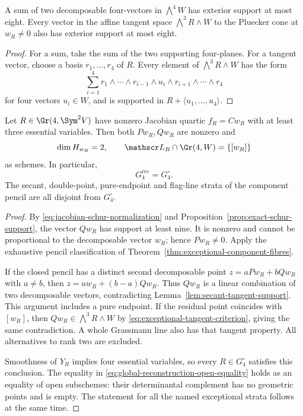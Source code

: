 \begin{lemma}
\label{lem:secant-tangent-support}
A sum of two decomposable four-vectors in \(\bigwedge^4W\)
has exterior support at most eight.  Every vector in the affine
tangent space \(\bigwedge^3R\wedge W\) to the Pluecker cone
at \(w_R\ne0\) also has exterior support at most eight.
\end{lemma}
\begin{proof}
For a sum, take the sum of the two supporting four-planes.  For a
tangent vector, choose a basis \(r_1,\ldots,r_4\) of \(R\).
Every element of \(\bigwedge^3R\wedge W\) has the form
\[
 \sum_{i=1}^4 r_1\wedge\cdots\wedge r_{i-1}
             \wedge u_i\wedge r_{i+1}\wedge\cdots\wedge r_4
\]
for four vectors \(u_i\in W\), and is supported in
\(R+\langle u_1,\ldots,u_4\rangle\).
\end{proof}

\begin{theorem}
\label{thm:global-schur-recombination}
Let \(R\in\Gr(4,\Sym^2V)\) have nonzero Jacobian quartic
\(f_R=Cw_R\) with at least three essential variables.  Then
both \(Pw_R,Qw_R\) are nonzero and
\[
 \dim H_{w_R}=2,\qquad
 \mathscr L_R\cap\Gr(4,W)=\{[w_R]\}
\]
as schemes.  In particular,
\begin{equation}\label{eq:global-reconstruction-open-equality}
                  G_4^{\mathrm{rec}}=G_4^\circ.
\end{equation}
The secant, double-point, pure-endpoint and flag-line strata of the
component pencil are all disjoint from \(G_4^\circ\).
\end{theorem}
\begin{proof}
By \eqref{eq:jacobian-schur-normalization} and
Proposition~\ref{prop:exact-schur-support}, the vector \(Qw_R\)
has support at least nine.  It is nonzero and cannot be proportional
to the decomposable vector \(w_R\); hence \(Pw_R\ne0\).
Apply the exhaustive pencil classification of
Theorem~\ref{thm:exceptional-component-fibres}.

If the closed pencil has a distinct second decomposable point
\(z=aPw_R+bQw_R\) with \(a\ne b\), then
\(z=a w_R+(b-a)Qw_R\).  Thus \(Qw_R\) is a linear
combination of two decomposable vectors, contradicting
Lemma~\ref{lem:secant-tangent-support}.  This argument includes a
pure endpoint.  If the residual point coincides with \([w_R]\),
then \(Qw_R\in\bigwedge^3R\wedge W\) by
\eqref{eq:exceptional-tangent-criterion}, giving the same
contradiction.  A whole Grassmann line also has that tangent
property.  All alternatives to rank two are excluded.

Smoothness of \(Y_R\) implies four essential variables, so every
\(R\in G_4^\circ\) satisfies this conclusion.  The equality
in \eqref{eq:global-reconstruction-open-equality} holds as an
equality of open subschemes: their determinantal complement has no
geometric points and is empty.  The statement for all the named
exceptional strata follows at the same time.
\end{proof}


